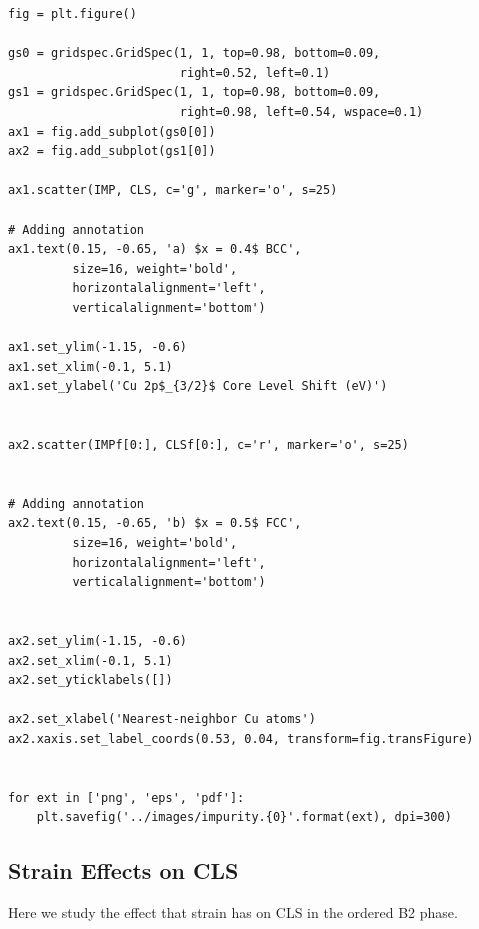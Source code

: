 \documentclass[number, sort&compress, review, 12pt]{elsarticle}
\begin{document}
\begin{verbatim}
fig = plt.figure()

gs0 = gridspec.GridSpec(1, 1, top=0.98, bottom=0.09,
                        right=0.52, left=0.1)
gs1 = gridspec.GridSpec(1, 1, top=0.98, bottom=0.09,
                        right=0.98, left=0.54, wspace=0.1)
ax1 = fig.add_subplot(gs0[0])
ax2 = fig.add_subplot(gs1[0])

ax1.scatter(IMP, CLS, c='g', marker='o', s=25)

# Adding annotation
ax1.text(0.15, -0.65, 'a) $x = 0.4$ BCC',
         size=16, weight='bold',
         horizontalalignment='left',
         verticalalignment='bottom')

ax1.set_ylim(-1.15, -0.6)
ax1.set_xlim(-0.1, 5.1)
ax1.set_ylabel('Cu 2p$_{3/2}$ Core Level Shift (eV)')


ax2.scatter(IMPf[0:], CLSf[0:], c='r', marker='o', s=25)


# Adding annotation
ax2.text(0.15, -0.65, 'b) $x = 0.5$ FCC',
         size=16, weight='bold',
         horizontalalignment='left',
         verticalalignment='bottom')


ax2.set_ylim(-1.15, -0.6)
ax2.set_xlim(-0.1, 5.1)
ax2.set_yticklabels([])

ax2.set_xlabel('Nearest-neighbor Cu atoms')
ax2.xaxis.set_label_coords(0.53, 0.04, transform=fig.transFigure)


for ext in ['png', 'eps', 'pdf']:
    plt.savefig('../images/impurity.{0}'.format(ext), dpi=300)
\end{verbatim}

\subsection{Strain Effects on CLS}
\label{sec-10-6}
Here we study the effect that strain has on CLS in the ordered B2 phase.
\end{document}
